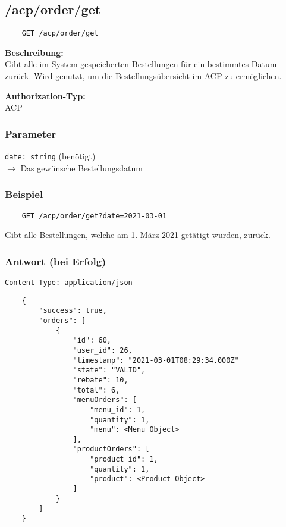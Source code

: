 \subsection{/acp/order/get}

\begin{lstlisting}
    GET /acp/order/get
\end{lstlisting}

\textbf{Beschreibung:} \\
Gibt alle im System gespeicherten Bestellungen für ein bestimmtes Datum zurück. Wird genutzt, um die Bestellungsübersicht im ACP zu ermöglichen.

\textbf{Authorization-Typ:} \\
ACP

\subsubsection{Parameter}

\lstinline{date: string} (benötigt) \\
$\rightarrow$ Das gewünsche Bestellungsdatum

\subsubsection{Beispiel}

\begin{lstlisting}
    GET /acp/order/get?date=2021-03-01
\end{lstlisting}

Gibt alle Bestellungen, welche am 1. März 2021 getätigt wurden, zurück.

\subsubsection{Antwort (bei Erfolg)}

\lstinline{Content-Type: application/json}
\begin{lstlisting}
    {
        "success": true, 
        "orders": [
            {
                "id": 60,
                "user_id": 26,
                "timestamp": "2021-03-01T08:29:34.000Z"
                "state": "VALID",
                "rebate": 10,
                "total": 6,
                "menuOrders": [
                    "menu_id": 1,
                    "quantity": 1,
                    "menu": <Menu Object>
                ],
                "productOrders": [
                    "product_id": 1,
                    "quantity": 1,
                    "product": <Product Object>
                ]
            }
        ]
    }
\end{lstlisting}
